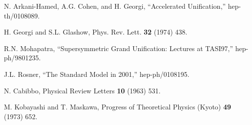 \documentclass[a4paper,12pt,oneside]{article}
\begin{document}
\begin{thebibliography}{99}
N. Arkani-Hamed, A.G. Cohen, and H. Georgi, ``Accelerated
Unification,'' hep-th/0108089.

H. Georgi and S.L. Glashow, Phys. Rev. Lett. \textbf{32} (1974) 438.

R.N. Mohapatra, ``Supersymmetric Grand Unification: Lectures at TASI97,'' hep-ph/9801235.

J.L. Rosner, ``The Standard Model in 2001,'' hep-ph/0108195.

N. Cabibbo, Physical Review Letters \textbf{10} (1963) 531.

M. Kobayashi and T. Maskawa, Progress of Theoretical Physics (Kyoto) \textbf{49} (1973) 652.

\end{thebibliography}
\end{document}
